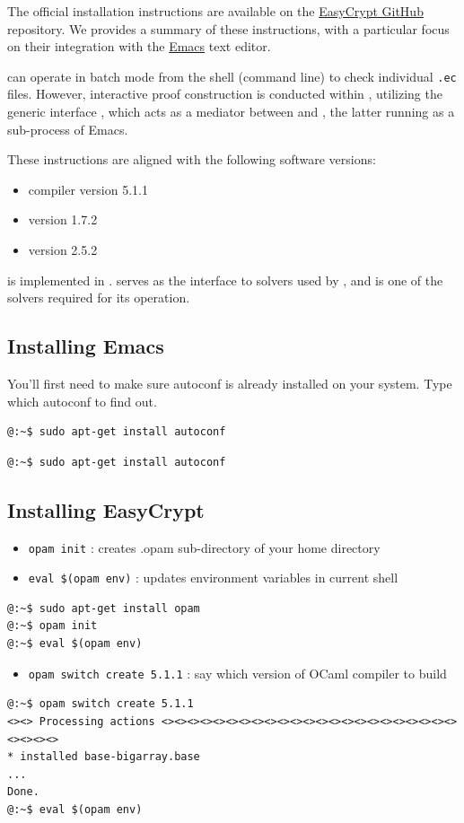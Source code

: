 The official \EasyCrypt installation instructions are available on the \hyperref{https://github.com/EasyCrypt/easycrypt}{github}{ec}{EasyCrypt GitHub} repository. We provides a summary of these instructions, with a particular focus on their integration with the \hyperref{https://www.gnu.org/software/emacs/}{site}{emacs}{Emacs} text editor.\par
\EasyCrypt can operate in batch mode from the shell (command line) to check individual \texttt{.ec} files. However, interactive proof construction is conducted within \Emacs, utilizing the generic interface \ProofGeneral, which acts as a mediator between \Emacs and \EasyCrypt, the latter running as a sub-process of Emacs.

These instructions are aligned with the following software versions:
\begin{itemize}
	\item \OCaml compiler version 5.1.1
	\item \WhyThree version 1.7.2
	\item \AltErgo version 2.5.2
\end{itemize}
\EasyCrypt is implemented in \OCaml. \WhyThree serves as the interface to \SMT solvers used by \EasyCrypt, and \AltErgo is one of the \SMT solvers required for its operation.

\subsection*{Installing Emacs}
You'll first need to make sure autoconf is already installed on your system. Type which autoconf to find out.
\begin{lstlisting}[style=normal]
@:~$ sudo apt-get install autoconf
\end{lstlisting}
\begin{lstlisting}[style=normal]
@:~$ sudo apt-get install autoconf
\end{lstlisting}

\subsection*{Installing EasyCrypt}
\begin{itemize}
	\item \texttt{opam init} : creates .opam sub-directory of your home directory
	\item \texttt{eval \$(opam env)} : updates environment variables in current shell
\end{itemize}
\begin{lstlisting}[style=normal]
@:~$ sudo apt-get install opam
@:~$ opam init
@:~$ eval $(opam env)
\end{lstlisting}
\begin{itemize}
\item \texttt{opam switch create 5.1.1} : say which version of OCaml compiler to build
\end{itemize}
\begin{lstlisting}[style=normal]
@:~$ opam switch create 5.1.1
<><> Processing actions <><><><><><><><><><><><><><><><><><><><><><><><><><><>
* installed base-bigarray.base
...
Done.
@:~$ eval $(opam env)
\end{lstlisting}


